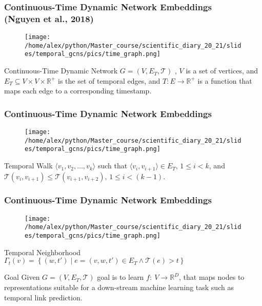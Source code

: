 \documentclass[fleqn, xcolor=x11names]{beamer}
\begin{document}
\begin{frame}\frametitle{Continuous-Time Dynamic Network Embeddings\\ (Nguyen et al., 2018)}

\begin{figure}[h]
\begin{center}
\texttt{[image: /home/alex/python/Master\_course/scientific\_diary\_20\_21/slides/temporal\_gcns/pics/time\_graph.png]}
\end{center}
\end{figure}

\begin{block}{Continuous-Time Dynamic Network}
$G = (V, E_T , \mathcal{T})$ , $V$ is a set of vertices, and $E_T \subseteq V \times V \times \mathbb{R}^{+}$
is the set of temporal edges, and $T : E \rightarrow \mathbb{R}^{+}$
is a function that maps each edge to a corresponding timestamp.
\end{block}


\end{frame}

\begin{frame}\frametitle{Continuous-Time Dynamic Network Embeddings}

\begin{figure}[h]
\begin{center}
\texttt{[image: /home/alex/python/Master\_course/scientific\_diary\_20\_21/slides/temporal\_gcns/pics/time\_graph.png]}
\end{center}
\end{figure}

\begin{block}{Temporal Walk}
$\langle v_1,v_2, \dots ,v_k\rangle$ such that 
$\langle v_i, v_{i+1}\rangle \in E_T, \, 1 \le i < k$, and 
$\mathcal{T}(v_i,v_{i+1}) \le \mathcal{T}(v_{i+1},v_{i+2}),\, 1 \le i < (k-1)$.
\end{block}
\end{frame}

\begin{frame}\frametitle{Continuous-Time Dynamic Network Embeddings}

\begin{figure}[h]
\begin{center}
\texttt{[image: /home/alex/python/Master\_course/scientific\_diary\_20\_21/slides/temporal\_gcns/pics/time\_graph.png]}
\end{center}
\end{figure}

\begin{block}{Temporal Neighborhood}
$ \Gamma_t(v) = \left\lbrace (w, t') \mid e=(v,w,t') \in E_T \wedge \mathcal{T}(e) > t  \right\rbrace $
\end{block}

\begin{block}{Goal}
Given $G = (V, E_T , \mathcal{T})$ goal is to learn 
$f:\: V \rightarrow \mathbb{R}^D$, that maps nodes to representations suitable for a down-stream machine learning
task such as temporal link prediction.
\end{block}

\end{frame}
\end{document}
